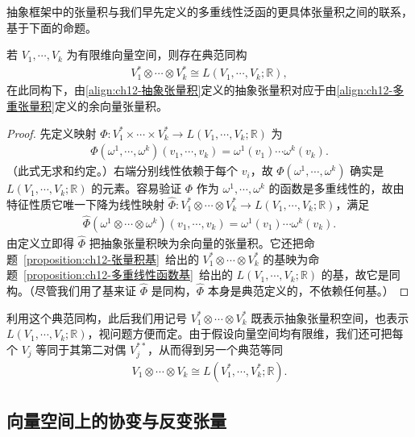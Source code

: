 \documentclass[../../main.tex]{subfiles}
\begin{document}
抽象框架中的张量积与我们早先定义的多重线性泛函的更具体张量积之间的联系，基于下面的命题。

\begin{proposition}[抽象张量积与具体张量积]\label{proposition:ch12-抽象与具体张量积}
若 $V_1,\cdots ,V_k$ 为有限维向量空间，则存在典范同构
\begin{align}
V_1^*\otimes\cdots\otimes V_k^*\cong L(V_1,\cdots ,V_k;\mathbb{R}),\label{align:ch12-抽象具体同构}
\end{align}
在此同构下，由\eqref{align:ch12-抽象张量积}定义的抽象张量积对应于由\eqref{align:ch12-多重张量积}定义的余向量张量积。
\end{proposition}

\begin{proof}
先定义映射 $\Phi\colon V_1^*\times\cdots\times V_k^*\to L(V_1,\cdots ,V_k;\mathbb{R})$ 为
\begin{align*}
\Phi(\omega^1,\cdots ,\omega^k)(v_1,\cdots ,v_k)=\omega^1(v_1)\cdots\omega^k(v_k).
\end{align*}
（此式无求和约定。）右端分别线性依赖于每个 $v_i$，故 $\Phi(\omega^1,\cdots ,\omega^k)$ 确实是 $L(V_1,\cdots ,V_k;\mathbb{R})$ 的元素。容易验证 $\Phi$ 作为 $\omega^1,\cdots ,\omega^k$ 的函数是多重线性的，故由特征性质它唯一下降为线性映射 $\widehat\Phi\colon V_1^*\otimes\cdots\otimes V_k^*\to L(V_1,\cdots ,V_k;\mathbb{R})$，满足
\begin{align*}
\widehat\Phi(\omega^1\otimes\cdots\otimes\omega^k)(v_1,\cdots ,v_k)=\omega^1(v_1)\cdots\omega^k(v_k).
\end{align*}
由定义立即得 $\widehat\Phi$ 把抽象张量积映为余向量的张量积。它还把命题~\ref{proposition:ch12-张量积基}~给出的 $V_1^*\otimes\cdots\otimes V_k^*$ 的基映为命题~\ref{proposition:ch12-多重线性函数基}~给出的 $L(V_1,\cdots ,V_k;\mathbb{R})$ 的基，故它是同构。（尽管我们用了基来证 $\widehat\Phi$ 是同构，$\widehat\Phi$ 本身是典范定义的，不依赖任何基。）
\end{proof}

利用这个典范同构，此后我们用记号 $V_1^*\otimes\cdots\otimes V_k^*$ 既表示抽象张量积空间，也表示 $L(V_1,\cdots ,V_k;\mathbb{R})$，视问题方便而定。由于假设向量空间均有限维，我们还可把每个 $V_j$ 等同于其第二对偶 $V_j^{**}$，从而得到另一个典范等同
\begin{align*}
V_1\otimes\cdots\otimes V_k\cong L(V_1^*,\cdots ,V_k^*;\mathbb{R}).
\end{align*}

\subsection*{向量空间上的协变与反变张量}
\end{document}
